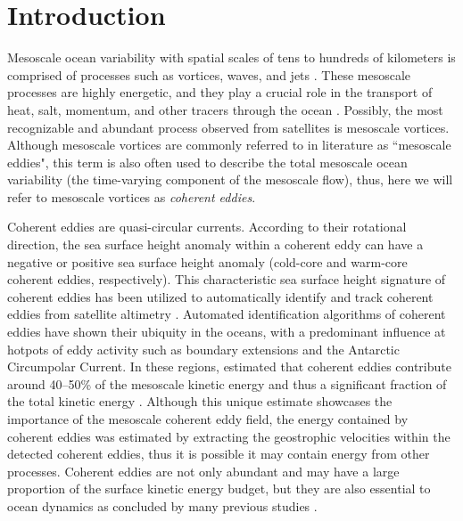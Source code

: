 \documentclass[draft,linenumbers]{agujournal2019}
\begin{document}
\begin{abstract}
\end{abstract}	

\section{Introduction}

Mesoscale ocean variability with spatial scales of tens to hundreds of kilometers is comprised of processes such as vortices, waves, and jets \citep{Ferrari_energy_2009, Fu_Eddy_2010}. 
These mesoscale processes are highly energetic, and they play a crucial role in the transport of heat, salt, momentum, and other tracers through the ocean \citep{Wunsch_energetics_2004, Wyrtki_Eddy_1976, Gill_Energy_1974}. Possibly, the most recognizable and abundant process observed from satellites is mesoscale vortices. Although mesoscale vortices are commonly referred to in literature as ``mesoscale eddies", this term is also often used to describe the total mesoscale ocean variability (the time-varying component of the mesoscale flow), thus, here we will refer to mesoscale vortices as \emph{coherent eddies}. 


Coherent eddies are quasi-circular currents. According to their rotational direction, the sea surface height anomaly within a coherent eddy can have a negative or positive sea surface height anomaly (cold-core and warm-core coherent eddies, respectively). 
This characteristic sea surface height signature of coherent eddies has been utilized to automatically identify and track coherent eddies from satellite altimetry \citep{Cui_eddy_identification_2020,Martinez_TKE_2019, Ashkezari_eddies_2016, Faghmous_A_2015,Chelton_Global_2007}. 
Automated identification algorithms of coherent eddies have shown their ubiquity in the oceans, with a predominant influence at hotpots of eddy activity such as boundary extensions and the Antarctic Circumpolar Current. In these regions, \citet{Chelton_The_2011} estimated that coherent eddies contribute around 40--50\% of the mesoscale kinetic energy \citep{Chelton_The_2011} and thus a significant fraction of the total kinetic energy \citep{Ferrari_energy_2009}. 
Although this unique estimate showcases the importance of the mesoscale coherent eddy field, the energy contained by coherent eddies was estimated by extracting the geostrophic velocities within the detected coherent eddies, thus it is possible it may contain energy from other processes. 
Coherent eddies are not only abundant and may have a large proportion of the surface kinetic energy budget, but they are also essential to ocean dynamics as concluded by many previous studies \citep{Patel_SO_eddies_2020,Schubert_submesoscale_2019,Pilo_eddy_2015,Frenger_Southern_2015,Frenger_Imprint_2013,BeronVera_Agulhas_2013,Siegel_Bio_2011,Hogg_Interdecadal_2006}.
\end{document}
